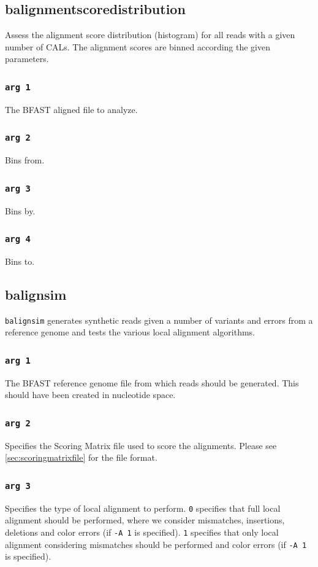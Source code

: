 \documentclass[a4paper,12pt]{book}
\newcommand{\TT}[1]{{\tt #1}} %
\newcommand{\BRGF}{BFAST reference genome file} %
\newcommand{\BAF}{BFAST aligned file} %
\begin{document}
\subsection{balignmentscoredistribution}
\label{sec:balignmentscoredistribution}
Assess the alignment score distribution (histogram) for all reads with a given number of CALs.
The alignment scores are binned according the given parameters.
\subsubsection{\TT{arg 1}}
The \BAF{} to analyze.
\subsubsection{\TT{arg 2}}
Bins from.
\subsubsection{\TT{arg 3}}
Bins by.
\subsubsection{\TT{arg 4}}
Bins to.
\subsection{balignsim}
\label{sec:balignsim}
\TT{balignsim} generates synthetic reads given a number of variants and errors from a reference genome and tests the various local alignment algorithms.

\subsubsection{\TT{arg 1}}
The \BRGF{} from which reads should be generated.
This should have been created in nucleotide space.
\subsubsection{\TT{arg 2}}
Specifies the Scoring Matrix file used to score the alignments.
Please see \autoref{sec:scoringmatrixfile} for the file format.
\subsubsection{\TT{arg 3}}
Specifies the type of local alignment to perform.
\TT{0} specifies that full local alignment should be performed, where we consider mismatches, insertions, deletions and color errors (if \TT{-A 1} is specified).
\TT{1} specifies that only local alignment considering mismatches should be performed and color errors (if \TT{-A 1} is specified).
\end{document}
